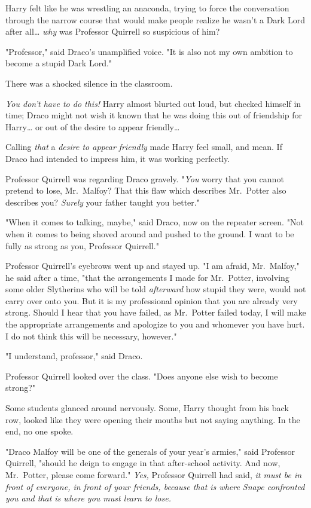 Harry felt like he was wrestling an anaconda, trying to force the conversation 
through the narrow course that would make people realize he wasn't a Dark Lord 
after all{\ldots} \emph{why} was Professor Quirrell so suspicious of him?

"Professor," said Draco's unamplified voice. "It is also not my own ambition to 
become a stupid Dark Lord."

There was a shocked silence in the classroom.

\emph{You don't have to do this!} Harry almost blurted out loud, but checked 
himself in time; Draco might not wish it known that he was doing this out of 
friendship for Harry{\ldots} or out of the desire to appear friendly{\ldots}

Calling \emph{that} a \emph{desire to appear friendly} made Harry feel small, 
and mean. If Draco had intended to impress him, it was working perfectly.

Professor Quirrell was regarding Draco gravely. "\emph{You} worry that you 
cannot pretend to lose, Mr.~Malfoy? That this flaw which describes Mr.~Potter 
also describes you? \emph{Surely} your father taught you better."

"When it comes to talking, maybe," said Draco, now on the repeater screen. "Not 
when it comes to being shoved around and pushed to the ground. I want to be 
fully as strong as you, Professor Quirrell."

Professor Quirrell's eyebrows went up and stayed up. "I am afraid, Mr.~Malfoy," 
he said after a time, "that the arrangements I made for Mr.~Potter, involving 
some older Slytherins who will be told \emph{afterward} how stupid they were, 
would not carry over onto you. But it is my professional opinion that you are 
already very strong. Should I hear that you have failed, as Mr.~Potter failed 
today, I will make the appropriate arrangements and apologize to you and 
whomever you have hurt. I do not think this will be necessary, however."

"I understand, professor," said Draco.

Professor Quirrell looked over the class. "Does anyone else wish to become 
strong?"

Some students glanced around nervously. Some, Harry thought from his back row, 
looked like they were opening their mouths but not saying anything. In the end, 
no one spoke.

"Draco Malfoy will be one of the generals of your year's armies," said 
Professor Quirrell, "should he deign to engage in that after-school activity. 
And now, Mr.~Potter, please come forward."
\sbreak
\emph{Yes,} Professor Quirrell had said, \emph{it must be in front of everyone, 
in front of your friends, because that is where Snape confronted you and that 
is where you must learn to lose.}

